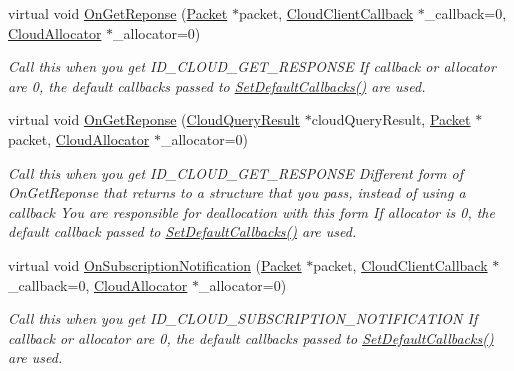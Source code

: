 \begin{DoxyCompactItemize}
\item 
virtual void \hyperlink{class_rak_net_1_1_cloud_client_a2142bcf4cd9484ee3c3e897d5fde5e55}{On\-Get\-Reponse} (\hyperlink{struct_rak_net_1_1_packet}{Packet} $\ast$packet, \hyperlink{class_rak_net_1_1_cloud_client_callback}{Cloud\-Client\-Callback} $\ast$\-\_\-callback=0, \hyperlink{class_rak_net_1_1_cloud_allocator}{Cloud\-Allocator} $\ast$\-\_\-allocator=0)
\begin{DoxyCompactList}\small\item\em Call this when you get I\-D\-\_\-\-C\-L\-O\-U\-D\-\_\-\-G\-E\-T\-\_\-\-R\-E\-S\-P\-O\-N\-S\-E If {\itshape callback} or {\itshape allocator} are 0, the default callbacks passed to \hyperlink{class_rak_net_1_1_cloud_client_a27fd20daa3c333eeaca61ac07a43836a}{Set\-Default\-Callbacks()} are used. \end{DoxyCompactList}\item 
virtual void \hyperlink{class_rak_net_1_1_cloud_client_a4fbfeb17194b333d83476eef0fbc281f}{On\-Get\-Reponse} (\hyperlink{struct_rak_net_1_1_cloud_query_result}{Cloud\-Query\-Result} $\ast$cloud\-Query\-Result, \hyperlink{struct_rak_net_1_1_packet}{Packet} $\ast$packet, \hyperlink{class_rak_net_1_1_cloud_allocator}{Cloud\-Allocator} $\ast$\-\_\-allocator=0)
\begin{DoxyCompactList}\small\item\em Call this when you get I\-D\-\_\-\-C\-L\-O\-U\-D\-\_\-\-G\-E\-T\-\_\-\-R\-E\-S\-P\-O\-N\-S\-E Different form of On\-Get\-Reponse that returns to a structure that you pass, instead of using a callback You are responsible for deallocation with this form If {\itshape allocator} is 0, the default callback passed to \hyperlink{class_rak_net_1_1_cloud_client_a27fd20daa3c333eeaca61ac07a43836a}{Set\-Default\-Callbacks()} are used. \end{DoxyCompactList}\item 
virtual void \hyperlink{class_rak_net_1_1_cloud_client_aefd840feec9d674e2066dd491d61fa62}{On\-Subscription\-Notification} (\hyperlink{struct_rak_net_1_1_packet}{Packet} $\ast$packet, \hyperlink{class_rak_net_1_1_cloud_client_callback}{Cloud\-Client\-Callback} $\ast$\-\_\-callback=0, \hyperlink{class_rak_net_1_1_cloud_allocator}{Cloud\-Allocator} $\ast$\-\_\-allocator=0)
\begin{DoxyCompactList}\small\item\em Call this when you get I\-D\-\_\-\-C\-L\-O\-U\-D\-\_\-\-S\-U\-B\-S\-C\-R\-I\-P\-T\-I\-O\-N\-\_\-\-N\-O\-T\-I\-F\-I\-C\-A\-T\-I\-O\-N If {\itshape callback} or {\itshape allocator} are 0, the default callbacks passed to \hyperlink{class_rak_net_1_1_cloud_client_a27fd20daa3c333eeaca61ac07a43836a}{Set\-Default\-Callbacks()} are used. \end{DoxyCompactList}\item 

\end{DoxyCompactItemize}
